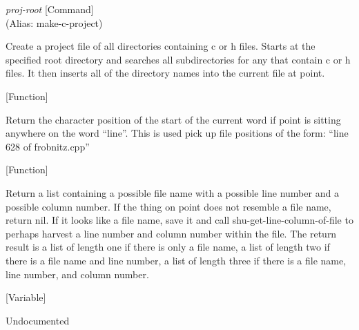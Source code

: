 \vspace{1em}
\noindent
{}
\usebox{\funcname}\emph{proj-root}
 \hfill [Command]\\%
 (Alias: make-c-project)

\begin{doc-string}
Create a project file of all directories containing c or h files.
Starts at the specified root directory and searches all subdirectories for
any that contain c or h files.  It then inserts all of the directory names
into the current file at point.
\end{doc-string}

\vspace{1em}
\noindent
{}
\usebox{\funcname}
 \hfill [Function]

\begin{doc-string}
Return the character position of the start of the current word if point is sitting
anywhere on the word ``line''.  This is used pick up file positions of the form:
``line 628 of frobnitz.cpp''
\end{doc-string}

\vspace{1em}
\noindent
{}
\usebox{\funcname}
 \hfill [Function]

\begin{doc-string}
Return a list containing a possible file name with a possible line number
and a possible column number.  If the thing on point does not resemble a file
name, return nil.  If it looks like a file name, save it and call
shu-get-line-column-of-file to perhaps harvest a line number and column number
within the file.  The return result is a list of length one if there is only
a file name, a list of length two if there is a file name and line number, a
list of length three if there is a file name, line number, and column number.
\end{doc-string}

\vspace{1em}
\noindent
{}
\usebox{\funcname}
 \hfill [Variable]

\begin{doc-string}
Undocumented
\end{doc-string}

